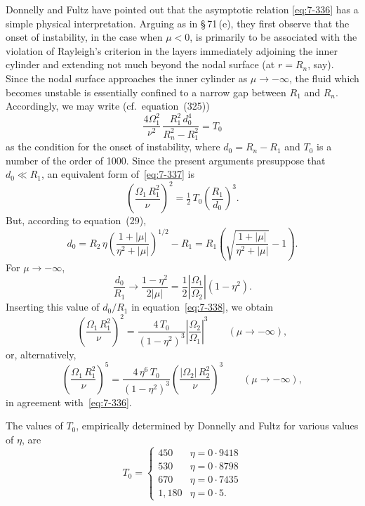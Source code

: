 Donnelly and Fultz have pointed out that the asymptotic relation
\eqref{eq:7-336} has a simple physical interpretation.  Arguing as in \S\,71\,(e), they
first observe that the onset of instability, in the case when $\mu < 0$, is
primarily to be associated with the violation of Rayleigh's criterion in
the layers immediately adjoining the inner cylinder and extending not
much beyond the nodal surface (at $r = R_n$, say).  Since the nodal
surface approaches the inner cylinder as $\mu \to -\infty$, the fluid which
becomes unstable is essentially confined to a narrow gap between $R_1$
and $R_n$.  Accordingly, we may write (cf.\ equation~(325))
\begin{equation}\label{eq:7-337}
\frac{4\Omega_1^2}{\nu^2}\,\frac{R_1^2\,d_0^4}{R_n^2 - R_1^2} = T_0
\end{equation}
as the condition for the onset of instability, where $d_0 = R_n - R_1$ and
$T_0$ is a number of the order of 1000.  Since the present arguments pre\-suppose
that $d_0 \ll R_1$, an equivalent form of~\eqref{eq:7-337} is
\begin{equation}\label{eq:7-338}
\left(\frac{\Omega_1\,R_1^2}{\nu}\right)^{\!2} = \tfrac{1}{2}\,T_0\!\left(\frac{R_1}{d_0}\right)^{\!3}\!.
\end{equation}
But, according to equation~(29),
\begin{equation}\label{eq:7-339}
d_0 = R_2\,\eta\!\left(\frac{1+|\mu|}{\eta^2+|\mu|}\right)^{\!1/2} - R_1
= R_1\!\left(\sqrt{\frac{1+|\mu|}{\eta^2+|\mu|}} - 1\right)\!.
\end{equation}
For $\mu \to -\infty$,
\begin{equation}\label{eq:7-340}
\frac{d_0}{R_1} \to \frac{1-\eta^2}{2|\mu|}
= \frac{1}{2}\left|\frac{\Omega_1}{\Omega_2}\right|(1-\eta^2).
\end{equation}
Inserting this value of $d_0/R_1$ in equation~\eqref{eq:7-338}, we obtain
\begin{equation}\label{eq:7-341}
\left(\frac{\Omega_1\,R_1^2}{\nu}\right)^{\!2}
= \frac{4\,T_0}{(1-\eta^2)^3}\left|\frac{\Omega_2}{\Omega_1}\right|^{\!3}
\qquad (\mu \to -\infty),
\end{equation}
or, alternatively,
\begin{equation}\label{eq:7-342}
\left(\frac{\Omega_1\,R_1^2}{\nu}\right)^{\!5}
= \frac{4\,\eta^6\,T_0}{(1-\eta^2)^3}\left(\frac{|\Omega_2|\,R_2^2}{\nu}\right)^{\!3}
\qquad (\mu \to -\infty),
\end{equation}
in agreement with~\eqref{eq:7-336}.

The values of $T_0$, empirically determined by Donnelly and Fultz for
various values of $\eta$, are
\begin{equation}\label{eq:7-343}
T_0 = \begin{cases}
450  & \eta = 0{\cdot}9418 \\
530  & \eta = 0{\cdot}8798 \\
670  & \eta = 0{\cdot}7435 \\
1{,}180 & \eta = 0{\cdot}5.
\end{cases}
\end{equation}


